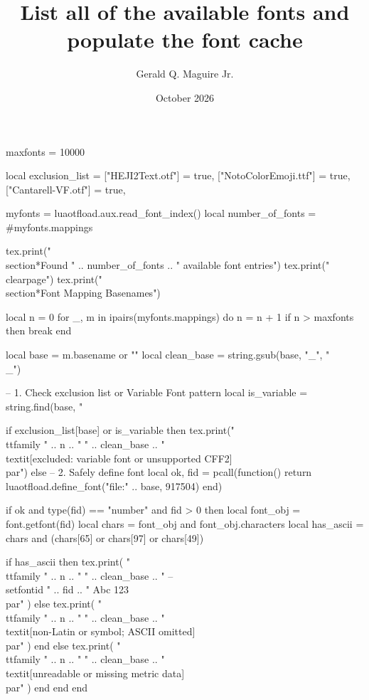 \documentclass{article}
\title{List all of the available fonts and populate the font cache}
\author{Gerald Q. Maguire Jr.}
\date{October 2026}
\begin{document}
\maketitle

\begin{luacode}
  maxfonts = 10000

  local exclusion_list = {
    ["HEJI2Text.otf"] = true,
    ["NotoColorEmoji.ttf"] = true,
    ["Cantarell-VF.otf"] = true,
  }

  myfonts = luaotfload.aux.read_font_index()
  local number_of_fonts = #myfonts.mappings

  tex.print("\\section*{Found " .. number_of_fonts .. " available font entries}")
  tex.print("\\clearpage")
  tex.print("\\section*{Font Mapping Basenames}")

  local n = 0
  for _, m in ipairs(myfonts.mappings) do
    n = n + 1
    if n > maxfonts then break end

    local base = m.basename or ""
    local clean_base = string.gsub(base, "_", "\\_")

    -- 1. Check exclusion list or Variable Font pattern
    local is_variable = string.find(base, "%

    if exclusion_list[base] or is_variable then
      tex.print("\\ttfamily " .. n .. " " .. clean_base .. " \\textit{[excluded: variable font or unsupported CFF2]}\\par")
    else
      -- 2. Safely define font
      local ok, fid = pcall(function()
        return luaotfload.define_font("file:" .. base, 917504)
      end)

      if ok and type(fid) == "number" and fid > 0 then
        local font_obj = font.getfont(fid)
        local chars = font_obj and font_obj.characters
        local has_ascii = chars and (chars[65] or chars[97] or chars[49])

        if has_ascii then
          tex.print(
            "\\ttfamily " .. n .. " " .. clean_base .. " -- {\\setfontid " .. fid .. " Abc 123}\\par"
          )
        else
          tex.print(
            "\\ttfamily " .. n .. " " .. clean_base .. " \\textit{[non-Latin or symbol; ASCII omitted]}\\par"
          )
        end
      else
        tex.print(
          "\\ttfamily " .. n .. " " .. clean_base .. " \\textit{[unreadable or missing metric data]}\\par"
        )
      end
    end
  end
\end{luacode}
\end{document}
